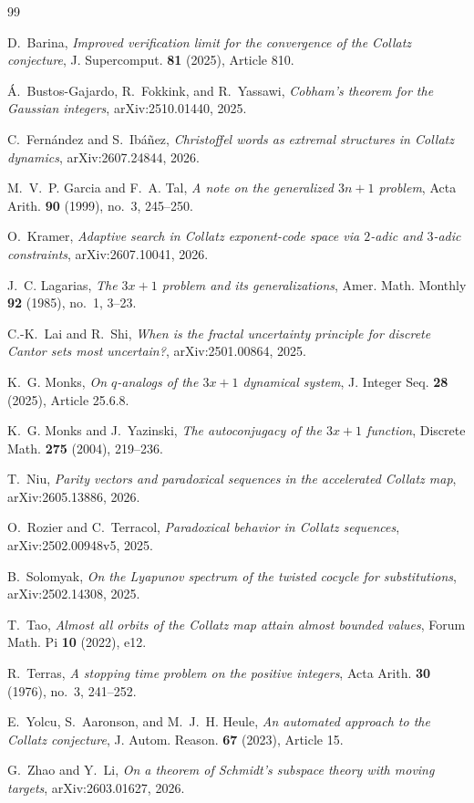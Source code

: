 \documentclass[11pt,reqno]{amsart}
\numberwithin{equation}{section}
\theoremstyle{definition}
\theoremstyle{remark}
\begin{document}
\begin{thebibliography}{99}

D.~Barina,
\emph{Improved verification limit for the convergence of the Collatz conjecture},
J. Supercomput. \textbf{81} (2025), Article 810.

\'{A}.~Bustos-Gajardo, R.~Fokkink, and R.~Yassawi,
\emph{Cobham's theorem for the Gaussian integers},
arXiv:2510.01440, 2025.

C.~Fern\'andez and S.~Ib\'a\~nez,
\emph{Christoffel words as extremal structures in Collatz dynamics},
arXiv:2607.24844, 2026.

M.~V.~P. Garcia and F.~A. Tal,
\emph{A note on the generalized $3n+1$ problem},
Acta Arith. \textbf{90} (1999), no.~3, 245--250.

O.~Kramer,
\emph{Adaptive search in Collatz exponent-code space via $2$-adic and $3$-adic constraints},
arXiv:2607.10041, 2026.

J.~C. Lagarias,
\emph{The $3x+1$ problem and its generalizations},
Amer. Math. Monthly \textbf{92} (1985), no.~1, 3--23.

C.-K.~Lai and R.~Shi,
\emph{When is the fractal uncertainty principle for discrete Cantor sets most uncertain?},
arXiv:2501.00864, 2025.

K.~G. Monks,
\emph{On $q$-analogs of the $3x+1$ dynamical system},
J. Integer Seq. \textbf{28} (2025), Article 25.6.8.

K.~G. Monks and J.~Yazinski,
\emph{The autoconjugacy of the $3x+1$ function},
Discrete Math. \textbf{275} (2004), 219--236.

T.~Niu,
\emph{Parity vectors and paradoxical sequences in the accelerated Collatz map},
arXiv:2605.13886, 2026.

O.~Rozier and C.~Terracol,
\emph{Paradoxical behavior in Collatz sequences},
arXiv:2502.00948v5, 2025.

B.~Solomyak,
\emph{On the Lyapunov spectrum of the twisted cocycle for substitutions},
arXiv:2502.14308, 2025.

T.~Tao,
\emph{Almost all orbits of the Collatz map attain almost bounded values},
Forum Math. Pi \textbf{10} (2022), e12.

R.~Terras,
\emph{A stopping time problem on the positive integers},
Acta Arith. \textbf{30} (1976), no.~3, 241--252.

E.~Yolcu, S.~Aaronson, and M.~J.~H. Heule,
\emph{An automated approach to the Collatz conjecture},
J. Autom. Reason. \textbf{67} (2023), Article 15.

G.~Zhao and Y.~Li,
\emph{On a theorem of Schmidt's subspace theory with moving targets},
arXiv:2603.01627, 2026.

\end{thebibliography}
\end{document}
